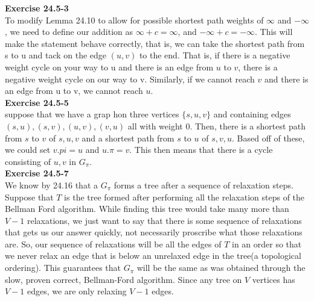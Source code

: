 \documentclass{article}
\begin{document}
\noindent\textbf{Exercise 24.5-3}\\

To modify Lemma 24.10 to allow for possible shortest path weights of $\infty$ and $-\infty$, we need to define our addition as $\infty + c = \infty$, and $-\infty + c = -\infty$. This will make the statement behave correctly, that is, we can take the shortest path from s to u and tack on the edge $(u,v)$ to the end. That is, if there is a negative weight cycle on your way to u and there is an edge from $u$ to $v$, there is a negative weight cycle on our way to v. Similarly, if we cannot reach $v$ and there is an edge from u to v, we cannot reach $u$.\\

\noindent\textbf{Exercise 24.5-5}\\
suppose that we have a grap hon three vertices $\{s,u,v\}$ and containing edges $(s,u),(s,v),(u,v),(v,u)$ all with weight 0. Then, there is a shortest path from $s$ to $v$ of $s,u,v$ and a shortest path from $s$ to $u$ of $s,v,u$. Based off of these, we could set $v.pi= u$ and $u.\pi = v$. This then means that there is a cycle consisting of $u,v$ in $G_\pi$.\\

\noindent\textbf{Exercise 24.5-7}\\
We know by 24.16 that a $G_\pi$ forms a tree after a sequence of relaxation steps. Suppose that $T$ is the tree formed after performing all the relaxation steps of the Bellman Ford algorithm. While finding this tree would take many more than $V-1$ relaxations, we just want to say that there is some sequence of relaxations that gets us our answer quickly, not necessarily proscribe what those relaxations are. So, our sequence of relaxations will be all the edges of $T$ in an order so that we never relax an edge that is below an unrelaxed edge in the tree(a topological ordering). This guarantees that $G_\pi$ will be the same as was obtained through the slow, proven correct, Bellman-Ford algorithm. Since any tree on $V$ vertices has $V-1$ edges, we are only relaxing $V-1$ edges.\\
\end{document}
